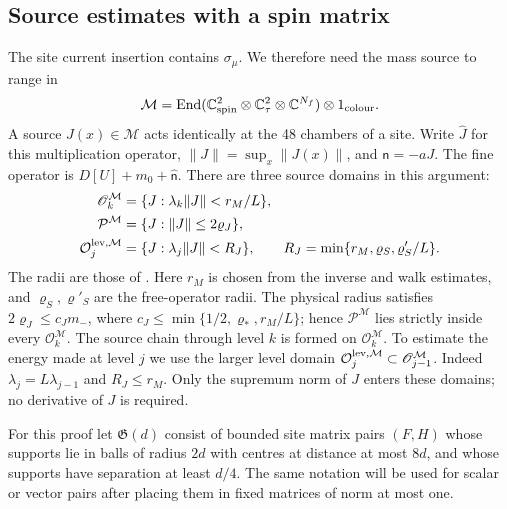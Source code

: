 \documentclass[11pt,letterpaper,reqno]{amsart}
\theoremstyle{definition}
\theoremstyle{remark}
\begin{document}
\subsection{Source estimates with a spin matrix}

The site current insertion contains $\sigma_\mu$.  We therefore
need the mass source to range in
\[
 \mathcal M=\operatorname{End}
       (\mathbb C^2_{\rm spin}\otimes\mathbb C^2_\tau
                          \otimes\mathbb C^{N_f})\otimes1_{\rm colour}.
\]
A source $J(x)\in\mathcal M$ acts identically at the 48
chambers of a site. Write $\hat J$ for this multiplication
operator, $\|J\|=\sup_x\|J(x)\|$, and $\mathsf n=-aJ$.
The fine operator is $D[U]+m_0+\hat{\mathsf n}$.
There are three source domains in this argument:
\begin{align*}
 \mathscr O_k^{\mathcal M}
   &=\{J:\lambda_k\|J\|<r_M/L\},\\
 \mathcal P^{\mathcal M}
   &=\{J:\|J\|\le2\varrho_J\},\\
 \mathcal O_j^{{\rm lev},\mathcal M}
   &=\{J:\lambda_j\|J\|<R_J\},
 \qquad R_J=\min\{r_M,\varrho_S,\varrho'_S/L\}.
\end{align*}
The radii are those of \cite[Sections 10 and 11]{QCDM1}.
Here $r_M$ is chosen from the inverse and walk estimates,
and $\varrho_S,\varrho'_S$ are the free-operator radii.
The physical radius satisfies
$2\varrho_J\le c_J{m_-}$, where
$c_J\le\min\{1/2,\varrho_*,r_M/L\}$; hence
$\mathcal P^{\mathcal M}$ lies strictly inside every
$\mathscr O_k^{\mathcal M}$.
The source chain through level $k$ is formed on
$\mathscr O_k^{\mathcal M}$. To estimate the energy made
at level $j$ we use the larger level domain
$\mathcal O_j^{{\rm lev},\mathcal M}\subset
\mathscr O_{j-1}^{\mathcal M}$.
Indeed $\lambda_j=L\lambda_{j-1}$ and $R_J\le r_M$.
Only the supremum norm of $J$ enters these domains; no
derivative of $J$ is required.

For this proof let $\mathfrak G(d)$ consist of bounded site
matrix pairs $(F,H)$ whose supports lie in balls of radius
$2d$ with centres at distance at most $8d$, and whose
supports have separation at least $d/4$.  The same notation
will be used for scalar or vector pairs after placing them
in fixed matrices of norm at most one.
\end{document}
